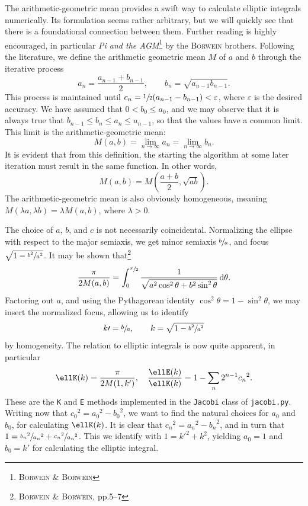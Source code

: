 The arithmetic-geometric mean provides a swift way to calculate elliptic integrals numerically.
Its formulation seems rather arbitrary, but we will quickly see that there is a foundational connection between them.
Further reading is highly encouraged, in particular \emph{Pi and the AGM}\footnote{\cite{borwein1987pi} \textsc{Borwein} \& \textsc{Borwein}} by the \textsc{Borwein} brothers.
Following the literature, we define the arithmetic geometric mean $M$ of $a$ and $b$ through the iterative process
\[
a_{n} = \frac{a_{n-1} + b_{n-1}}{2}, \qquad b_{n} = \sqrt{a_{n-1} b_{n-1}}.
\]
This process is maintained until $c_{n} = \sfrac{1}{2}(a_{n-1} - b_{n-1}) < \varepsilon$, where $\varepsilon$ is the desired accuracy.
We have assumed that $0 < b_0 \leq a_0$, and we may observe that it is always true that $b_{n-1} \leq b_n \leq a_n \leq a_{n-1}$, so that the values have a common limit.
This limit is the arithmetic-geometric mean:
\[
M(a, b) = \lim_{n \to \infty} a_n = \lim_{n \to \infty} b_n.
\]
It is evident that from this definition, the starting the algorithm at some later iteration must result in the same function.
In other words,
\[
M(a, b) = M{\left( \frac{a + b}{2}, \sqrt{ab} \right)}.
\]
The arithmetic-geometric mean is also obviously homogeneous, meaning $M(\lambda a, \lambda b) = \lambda M(a,b)$, where $\lambda > 0$.

The choice of $a$, $b$, and $c$ is not necessarily coincidental.
Normalizing the ellipse with respect to the major semiaxis, we get minor semiaxis $\sfrac{b}{a}$, and focus $\sqrt{1 - \sfrac{b^2}{a^2}}$.
It may be shown that\footnote{\cite{borwein1987pi} \textsc{Borwein} \& \textsc{Borwein}, pp.5--7}
\[
\frac{\pi}{2 M(a, b)} = \int_{0}^{\sfrac{\pi}{2}} \frac{1}{\sqrt{a^2 \cos^2{\theta} + b^2 \sin^2{\theta}}} \,\mathrm{d}\theta.
\]
Factoring out $a$, and using the Pythagorean identity $\cos^2{\theta} = 1 - \sin^2{\theta}$, we may insert the normalized focus, allowing us to identify
\[
k\prime = \sfrac{b}{a}, \qquad k = \sqrt{1 - \sfrac{b^2}{a^2}}
\]
by homogeneity.
The relation to elliptic integrals is now quite apparent, in particular
\[
\ellK(k) = \frac{\pi}{2 M(1, k^{\prime})}, \quad \frac{\ellE(k)}{\ellK(k)} = 1 - \sum_{n} 2^{n-1} {c_n}^2.
\]
These are the \texttt{K} and \texttt{E} methods implemented in the \texttt{Jacobi} class of \texttt{jacobi.py}.
Writing now that ${c_0}^2 = {a_0}^2 - {b_0}^2$, we want to find the natural choices for $a_0$ and $b_0$, for calculating $\ellK(k)$.
It is clear that ${c_n}^2 = {a_n}^2 - {b_n}^2$, and in turn that $1 = \sfrac{{b_n}^2}{{a_n}^2} + \sfrac{{c_n}^2}{{a_n}^2}$.
This we identify with $1 = {k\prime}^2 + k^2$, yielding $a_0 = 1$ and $b_0 = k\prime$ for calculating the elliptic integral.

